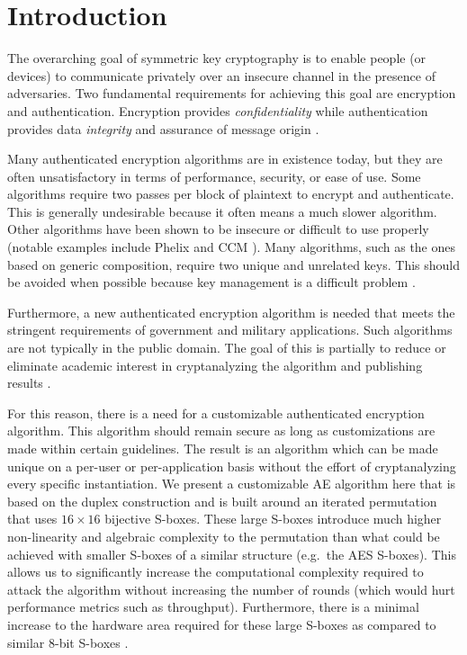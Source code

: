 \section{Introduction}
The overarching goal of symmetric key cryptography is to enable people (or devices) to communicate privately over an insecure channel in the presence of adversaries.
Two fundamental requirements for achieving this goal are encryption and authentication.
Encryption provides \emph{confidentiality} while authentication provides data \emph{integrity} and assurance of message origin \cite{Stinson2006_CTAP}.

Many authenticated encryption algorithms are in existence today, but they are often unsatisfactory in terms of performance, security, or ease of use.
Some algorithms require two passes per block of plaintext to encrypt and authenticate.
This is generally undesirable because it often means a much slower algorithm.
Other algorithms have been shown to be insecure or difficult to use properly (notable examples include Phelix \cite{Wu2007_PhelixAttack} and CCM \cite{Rogaway2003_CritiqueOfCCM}).
Many algorithms, such as the ones based on generic composition, require two unique and unrelated keys.
This should be avoided when possible because key management is a difficult problem \cite{Ferguson2010_CryptographyEngineering}.

Furthermore, a new authenticated encryption algorithm is needed that meets the stringent requirements of government and military applications.
Such algorithms are not typically in the public domain.
The goal of this is partially to reduce or eliminate academic interest in cryptanalyzing the algorithm and publishing results \cite{Kurdziel2002_BaselineRequirements}.

For this reason, there is a need for a customizable authenticated encryption algorithm.
This algorithm should remain secure as long as customizations are made within certain guidelines.
The result is an algorithm which can be made unique on a per-user or per-application basis without the effort of cryptanalyzing every specific instantiation.
We present a customizable AE algorithm here that is based on the duplex construction and is built around an iterated permutation that uses $16 \times 16$ bijective S-boxes.
These large S-boxes introduce much higher non-linearity and algebraic complexity to the permutation than what could be achieved with smaller S-boxes of a similar structure (e.g.\ the AES S-boxes).
This allows us to significantly increase the computational complexity required to attack the algorithm without increasing the number of rounds (which would hurt performance metrics such as throughput).
Furthermore, there is a minimal increase to the hardware area required for these large S-boxes as compared to similar $8$-bit S-boxes \cite{Wood2013_SboxThesis}.


